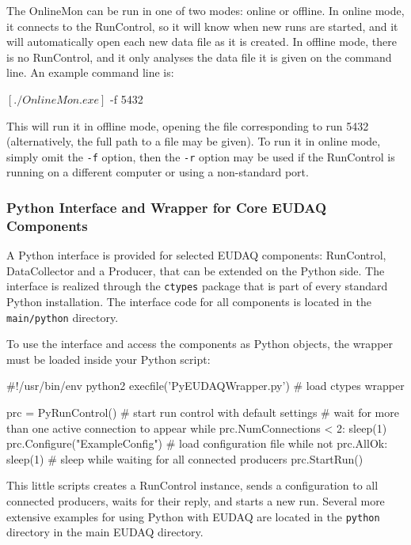 The OnlineMon can be run in one of two modes: online or offline.
In online mode, it connects to the RunControl, so it will know when new runs are started,
and it will automatically open each new data file as it is created.
In offline mode, there is no RunControl,
and it only analyses the data file it is given on the command line. 
An example command line is:
\begin{listing}[mybash]
$[./OnlineMon.exe]$ -f 5432
\end{listing}

This will run it in offline mode, opening the file corresponding to run 5432
(alternatively, the full path to a file may be given).
To run it in online mode, simply omit the \texttt{-f} option,
then the \texttt{-r} option may be used if the RunControl
is running on a different computer or using a non-standard port.

\subsubsection{Python Interface and Wrapper for Core EUDAQ Components}
A Python interface is provided for selected EUDAQ components:
RunControl, DataCollector and a Producer, that can be extended
on the Python side. The interface is realized through the
\texttt{ctypes} package that is part of every standard Python
installation. The interface code for all components is located in the
\texttt{main/python} directory. 

To use the interface and access the components as Python objects, the
wrapper must be loaded inside your Python script:

\begin{listing}[python]
  #!/usr/bin/env python2 
  execfile('PyEUDAQWrapper.py') # load ctypes wrapper

  prc = PyRunControl() # start run control with default settings
  # wait for more than one active connection to appear
  while prc.NumConnections < 2:
      sleep(1)
  prc.Configure("ExampleConfig") # load configuration file
  while not prc.AllOk:
      sleep(1) # sleep while waiting for all connected producers
  prc.StartRun()
\end{listing}

This little scripts creates a RunControl instance, sends a
configuration to all connected producers, waits for their reply, and
starts a new run. Several more extensive examples for using Python
with EUDAQ are located in the \texttt{python} directory in the main
EUDAQ directory.

